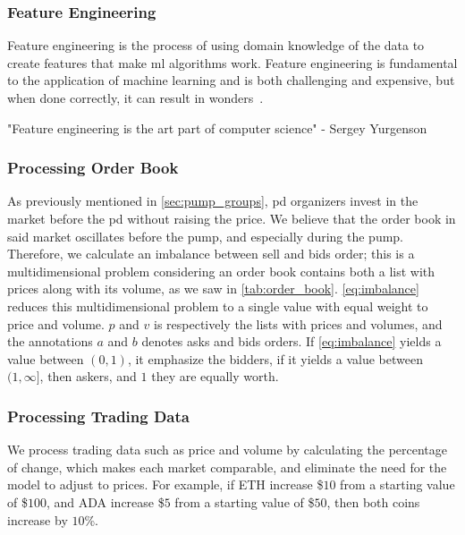 

\subsubsection{Feature Engineering}
Feature engineering is the process of using domain knowledge of the data to create features that make \ac{ml} algorithms work. Feature engineering is fundamental to the application of machine learning and is both challenging and expensive, but when done correctly, it can result in wonders~\cite{feature_engin}.

\begin{displayquote}
    \begin{em}
        "Feature engineering is the art part of computer science" - Sergey Yurgenson
    \end{em}
\end{displayquote}
 
\subsubsection{Processing Order Book}
As previously mentioned in \autoref{sec:pump_groups}, \ac{pd} organizers invest in the market before the \ac{pd} without raising the price. We believe that the order book in said market oscillates before the pump, and especially during the pump. Therefore, we calculate an imbalance between sell and bids order; this is a multidimensional problem considering an order book contains both a list with prices along with its volume, as we saw in \autoref{tab:order_book}. \autoref{eq:imbalance} reduces this multidimensional problem to a single value with equal weight to price and volume. $p$ and $v$ is respectively the lists with prices and volumes, and the annotations $a$ and $b$ denotes asks and bids orders. If \autoref{eq:imbalance} yields a value between $(0,1)$, it emphasize the bidders, if it yields a value between $(1, \infty]$, then askers, and $1$ they are equally worth.



\subsubsection{Processing Trading Data}
We process trading data such as price and volume by calculating the percentage of change, which makes each market comparable, and eliminate the need for the model to adjust to prices. For example, if ETH increase \$$10$ from a starting value of \$$100$, and ADA increase \$$5$ from a starting value of \$$50$, then both coins increase by $10$\%.

